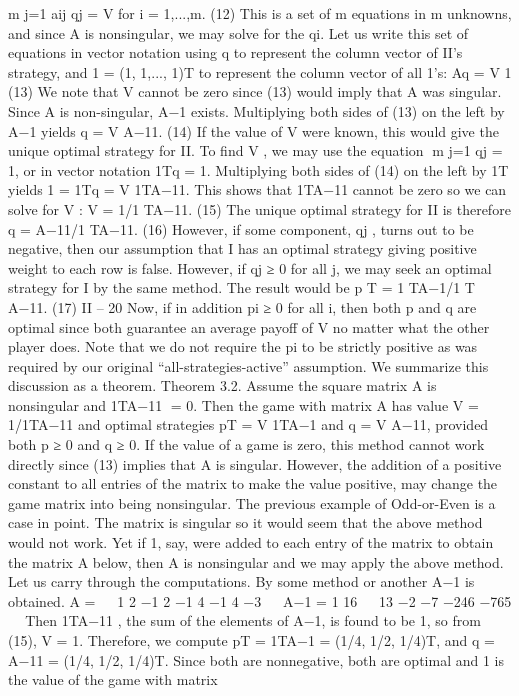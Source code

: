 m
j=1
aij qj = V for i = 1,...,m. (12)
This is a set of m equations in m unknowns, and since A is nonsingular, we may solve
for the qi. Let us write this set of equations in vector notation using q to represent the
column vector of II’s strategy, and 1 = (1, 1,..., 1)T to represent the column vector of all
1’s:
Aq = V 1 (13)
We note that V cannot be zero since (13) would imply that A was singular. Since A is
non-singular, A−1 exists. Multiplying both sides of (13) on the left by A−1 yields
q = V A−11. (14)
If the value of V were known, this would give the unique optimal strategy for II. To find
V , we may use the equation m
j=1 qj = 1, or in vector notation 1Tq = 1. Multiplying both
sides of (14) on the left by 1T yields 1 = 1Tq = V 1TA−11. This shows that 1TA−11 cannot
be zero so we can solve for V :
V = 1/1
TA−11. (15)
The unique optimal strategy for II is therefore
q = A−11/1
TA−11. (16)
However, if some component, qj , turns out to be negative, then our assumption that I has
an optimal strategy giving positive weight to each row is false.
However, if qj ≥ 0 for all j, we may seek an optimal strategy for I by the same method.
The result would be
p
T = 1
TA−1/1
T
A−11. (17)
II – 20
Now, if in addition pi ≥ 0 for all i, then both p and q are optimal since both guarantee an
average payoff of V no matter what the other player does. Note that we do not require the
pi to be strictly positive as was required by our original “all-strategies-active” assumption.
We summarize this discussion as a theorem.
Theorem 3.2. Assume the square matrix A is nonsingular and 1TA−11 = 0. Then the
game with matrix A has value V = 1/1TA−11 and optimal strategies pT = V 1TA−1 and
q = V A−11, provided both p ≥ 0 and q ≥ 0.
If the value of a game is zero, this method cannot work directly since (13) implies
that A is singular. However, the addition of a positive constant to all entries of the matrix
to make the value positive, may change the game matrix into being nonsingular. The
previous example of Odd-or-Even is a case in point. The matrix is singular so it would
seem that the above method would not work. Yet if 1, say, were added to each entry of
the matrix to obtain the matrix A below, then A is nonsingular and we may apply the
above method. Let us carry through the computations. By some method or another A−1
is obtained.
A =
⎛
⎝
1 2 −1
2 −1 4
−1 4 −3
⎞
⎠ A−1 = 1
16
⎛
⎝
13 −2 −7
−246
−765
⎞
⎠
Then 1TA−11 , the sum of the elements of A−1, is found to be 1, so from (15), V = 1.
Therefore, we compute pT = 1TA−1 = (1/4, 1/2, 1/4)T, and q = A−11 = (1/4, 1/2, 1/4)T.
Since both are nonnegative, both are optimal and 1 is the value of the game with matrix
